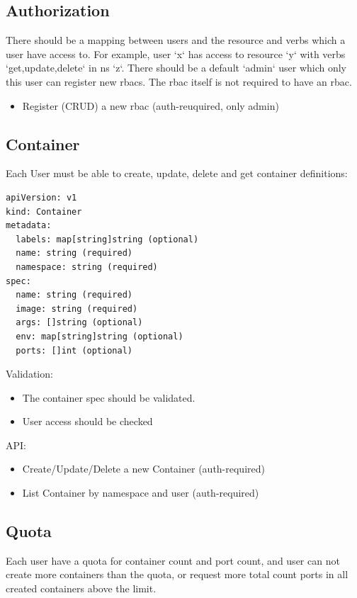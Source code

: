 \documentclass{article}
\begin{document}
\subsection{Authorization}

There should be a mapping between users and the resource and verbs which a user have access to. For example, user `x` has access to resource `y` with verbs `get,update,delete` in ns `z`. There should be a default `admin` user which only this user can register new rbacs. The rbac itself is not required to have an rbac.

\begin{itemize}
    \item Register (CRUD) a new rbac (auth-reuquired, only admin)
\end{itemize}

\subsection{Container}
Each User must be able to create, update, delete and get container definitions:

\begin{verbatim}
apiVersion: v1
kind: Container
metadata:
  labels: map[string]string (optional)
  name: string (required)
  namespace: string (required)
spec:
  name: string (required)
  image: string (required)
  args: []string (optional)
  env: map[string]string (optional)
  ports: []int (optional)
\end{verbatim}

Validation:
\begin{itemize}
  \item The container spec should be validated.
  \item User access should be checked
\end{itemize}

API:
\begin{itemize}
  \item Create/Update/Delete a new Container (auth-required)
  \item List Container by namespace and user (auth-required)
\end{itemize}

\subsection{Quota}

Each user have a quota for container count and port count, and user can not create more containers than the quota, or request more total count ports in all created containers above the limit.
\end{document}
